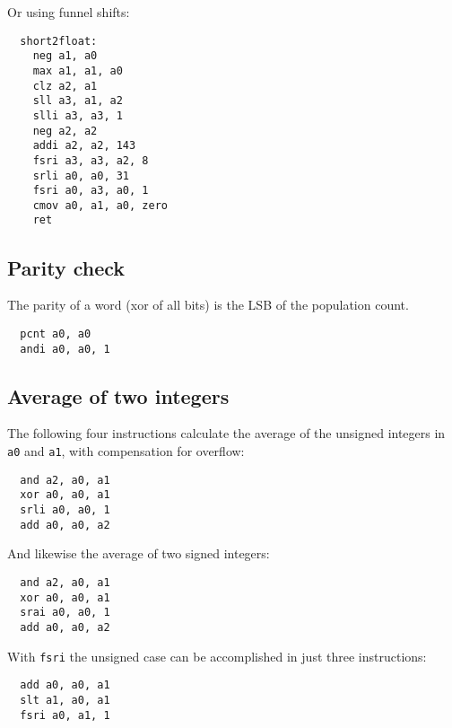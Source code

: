 Or using funnel shifts:

\begin{minipage}{\linewidth}
\begin{verbatim}
  short2float:
    neg a1, a0
    max a1, a1, a0
    clz a2, a1
    sll a3, a1, a2
    slli a3, a3, 1
    neg a2, a2
    addi a2, a2, 143
    fsri a3, a3, a2, 8
    srli a0, a0, 31
    fsri a0, a3, a0, 1
    cmov a0, a1, a0, zero
    ret
\end{verbatim}
\end{minipage}


\subsection{Parity check}

The parity of a word (xor of all bits) is the LSB of the population count.

\begin{verbatim}
  pcnt a0, a0
  andi a0, a0, 1
\end{verbatim}


\subsection{Average of two integers}

The following four instructions calculate the average of the unsigned
integers in {\tt a0} and {\tt a1}, with compensation for overflow:

\begin{verbatim}
  and a2, a0, a1
  xor a0, a0, a1
  srli a0, a0, 1
  add a0, a0, a2
\end{verbatim}

And likewise the average of two signed integers:

\begin{verbatim}
  and a2, a0, a1
  xor a0, a0, a1
  srai a0, a0, 1
  add a0, a0, a2
\end{verbatim}

With {\tt fsri} the unsigned case can be accomplished in just three
instructions:

\begin{verbatim}
  add a0, a0, a1
  slt a1, a0, a1
  fsri a0, a1, 1
\end{verbatim}

